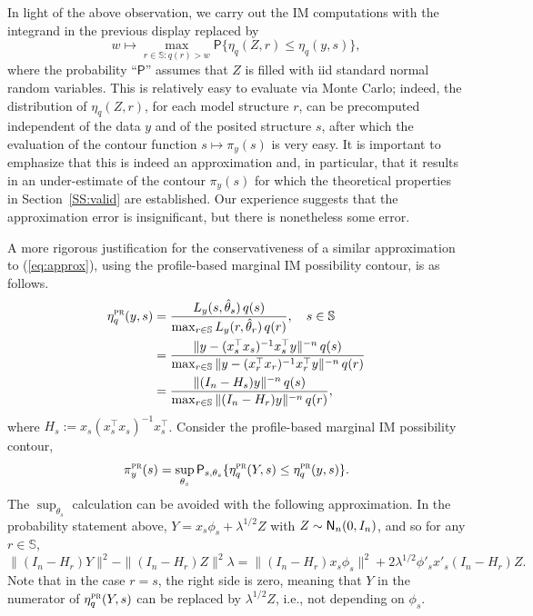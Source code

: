 \documentclass[12pt]{article}
\def\SS{\mathbb{S}}
\def\prob{\mathsf{P}}
\begin{document}
In light of the above observation, we carry out the IM computations with the integrand in the previous display replaced by 
\begin{equation}
\label{eq:approx}
w \mapsto \max_{r \in \SS: q(r) > w} \prob\{ \eta_q(Z, r) \leq \eta_q(y,s)\},
\end{equation}
where the probability ``$\prob$'' assumes that $Z$ is filled with iid standard normal random variables.  This is relatively easy to evaluate via Monte Carlo; indeed, the distribution of $\eta_q(Z,r)$, for each model structure $r$, can be precomputed independent of the data $y$ and of the posited structure $s$, after which the evaluation of the contour function $s \mapsto \pi_y(s)$ is very easy.  It is important to emphasize that this is indeed an approximation and, in particular, that it results in an under-estimate of the contour $\pi_y(s)$ for which the theoretical properties in Section~\ref{SS:valid} are established.  Our experience suggests that the approximation error is insignificant, but there is nonetheless some error.  

A more rigorous justification for the conservativeness of a similar approximation to (\ref{eq:approx}), using the profile-based marginal IM possibility contour, is as follows.
\begin{align*}
\eta_q^\text{\sc pr}(y,s) & = \frac{L_y(s,\hat\theta_s) \, q(s)}{\max_{r \in \SS} L_y(r,\hat\theta_r) \, q(r)}, \quad s \in \SS \\
& = \frac{\|y - (x_s^\top x_s)^{-1} x_s^\top y\|^{-n} \, q(s)}{\max_{r \in \SS} \|y - (x_r^\top x_r)^{-1} x_r^\top y\|^{-n} \, q(r)} \\
& = \frac{\|(I_n - H_s)y\|^{-n} \, q(s)}{\max_{r \in \SS} \|(I_n - H_r)y\|^{-n} \, q(r)},
\end{align*}
where $H_s := x_s (x_s^\top x_s)^{-1} x_s^\top$.  Consider the profile-based marginal IM possibility contour,
\[
\pi_y^\text{\sc pr}(s) = \sup_{\theta_s}\prob_{s,\theta_{s}}\{ \eta_q^\text{\sc pr}(Y,s) \leq \eta_q^\text{\sc pr}(y,s) \}.
\]
The $\sup_{\theta_s}$ calculation can be avoided with the following approximation.  In the probability statement above, $Y = x_s\phi_s + \lambda^{1/2} Z$ with $Z \sim {\sf N}_n(0,I_{n})$, and so for any $r \in \SS$,
\[
\|(I_n - H_r)Y\|^2 - \|(I_n - H_r)Z\|^2 \lambda = \|(I_n - H_r)x_s\phi_s\|^2 + 2\lambda^{1/2} \phi'_s x'_s(I_n - H_r) Z.
\]
Note that in the case $r = s$, the right side is zero, meaning that $Y$ in the numerator of $\eta_q^\text{\sc pr}(Y,s)$ can be replaced by $\lambda^{1/2}Z$, i.e., not depending on $\phi_s$.  
\end{document}
